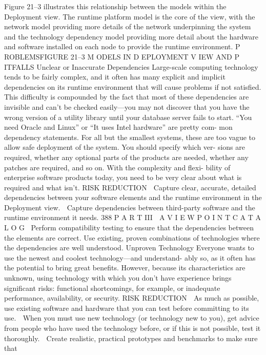 Figure 21–3 illustrates this relationship between the models within the
Deployment view. The runtime platform model is the core of the view, with
the network model providing more details of the network underpinning the
system and the technology dependency model providing more detail about
the hardware and software installed on each node to provide the runtime
environment.
P ROBLEMSFIGURE 21–3 M ODELS IN D EPLOYMENT V IEW
AND P ITFALLS
Unclear or Inaccurate Dependencies
Large-scale computing technology tends to be fairly complex, and it often has
many explicit and implicit dependencies on its runtime environment that will
cause problems if not satisfied. This difficulty is compounded by the fact that
most of these dependencies are invisible and can’t be checked easily—you
may not discover that you have the wrong version of a utility library until
your database server fails to start.
“You need Oracle and Linux” or “It uses Intel hardware” are pretty com-
mon dependency statements. For all but the smallest systems, these are too
vague to allow safe deployment of the system. You should specify which ver-
sions are required, whether any optional parts of the products are needed,
whether any patches are required, and so on. With the complexity and flexi-
bility of enterprise software products today, you need to be very clear about
what is required and what isn’t.
RISK REDUCTION
 Capture clear, accurate, detailed dependencies between your software
elements and the runtime environment in the Deployment view.
 Capture dependencies between third-party software and the runtime
environment it needs.
388
 P A R T III  A V I E W P O I N T C A T A L O G
Perform compatibility testing to ensure that the dependencies between
the elements are correct.
Use existing, proven combinations of technologies where the dependencies
are well understood.
Unproven Technology
Everyone wants to use the newest and coolest technology—and understand-
ably so, as it often has the potential to bring great benefits. However, because
its characteristics are unknown, using technology with which you don’t have
experience brings significant risks: functional shortcomings, for example, or
inadequate performance, availability, or security.
RISK REDUCTION
 As much as possible, use existing software and hardware that you can
test before committing to its use.
 When you must use new technology (or technology new to you), get
advice from people who have used the technology before, or if this is not
possible, test it thoroughly.
 Create realistic, practical prototypes and benchmarks to make sure that
